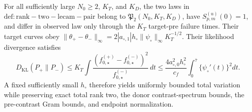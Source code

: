For all sufficiently large \(N_0\ge2\), \(K_T\), and \(K_D\), the two laws in \(\mathrm{def:rank-two-lecam-pair}\) belong to \(\mathfrak P_2(N_0,K_T,K_D)\), have \(S_{p,m}^{(u)}(0)=1\), and differ in observed law only through the \(K_T\) target-pre failure times. Their target curves obey \(\|\theta_+-\theta_-\|_\infty=2|a_{\circ,1}|h_\circ\|\psi_\circ\|_\infty K_T^{-1/2}\). Their likelihood divergence satisfies \[D_{\mathrm{KL}}(P_+\|P_-)\le K_T\int\frac{(f_{0,\star}^{(+)}-f_{0,\star}^{(-)})^2}{f_{0,\star}^{(-)}}\,dt\le\frac{4a_{\circ,0}^2h_\circ^2}{c_f}\int_0^{\bar\tau}\{\psi_\circ'(t)\}^2dt.\] A fixed sufficiently small \(h_\circ\) therefore yields uniformly bounded total variation while preserving exact total rank two, the donor contrast-spectrum bounds, the pre-contrast Gram bounds, and endpoint normalization.